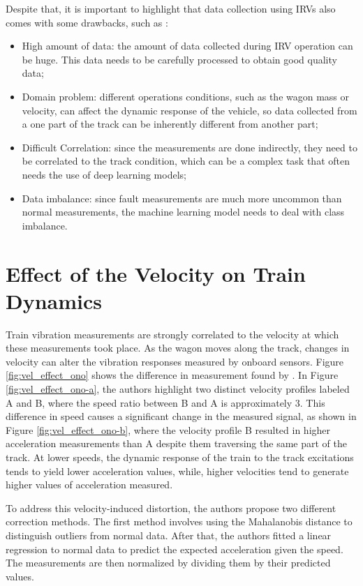Despite that, it is important to highlight that data collection using IRVs also comes with some drawbacks, such as \cite{GHIASI2025109516}:
\begin{itemize}
    \item High amount of data: the amount of data collected during IRV operation can be huge. This data needs to be carefully processed to obtain good quality data;
    \item Domain problem: different operations conditions, such as the wagon mass or velocity, can affect the dynamic response of the vehicle, so data collected from a one part of the track can be inherently different from another part;
    \item Difficult Correlation: since the measurements are done indirectly, they need to be correlated to the track condition, which can be a complex task that often needs the use of deep learning models;
    \item Data imbalance: since fault measurements are much more uncommon than normal measurements, the machine learning model needs to deal with class imbalance.
\end{itemize}

\section{Effect of the Velocity on Train Dynamics} \label{sec-vel-effect-measurement}

Train vibration measurements are strongly correlated to the velocity at which these measurements took place. As the wagon moves along the track, changes in velocity can alter the vibration responses measured by onboard sensors. Figure \ref{fig:vel_effect_ono} shows the difference in measurement found by \cite{Hironori_ONO202322-00239}. In Figure \ref{fig:vel_effect_ono-a}, the authors highlight two distinct velocity profiles labeled A and B, where the speed ratio between B and A is approximately 3. This difference in speed causes a significant change in the measured signal, as shown in Figure \ref{fig:vel_effect_ono-b}, where the velocity profile B resulted in higher acceleration measurements than A despite them traversing the same part of the track. At lower speeds, the dynamic response of the train to the track excitations tends to yield lower acceleration values, while, higher velocities tend to generate higher values of acceleration measured.

To address this velocity-induced distortion, the authors propose two different correction methods. The first method involves using the Mahalanobis distance \cite{de2000mahalanobis} to distinguish outliers from normal data. After that, the authors fitted a linear regression to normal data to predict the expected acceleration given the speed. The measurements are then normalized by dividing them by their predicted values.

